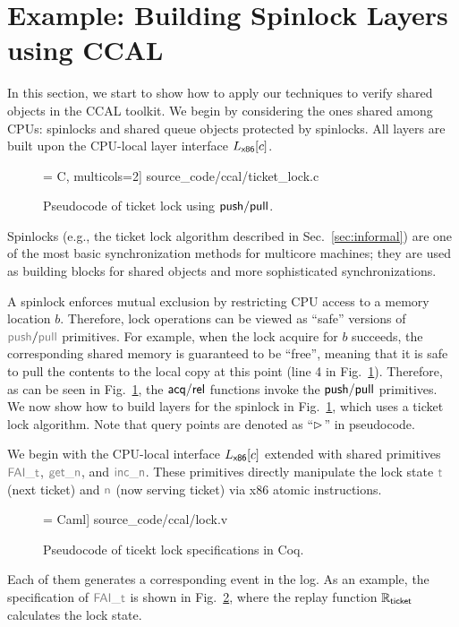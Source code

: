 \section{Example: Building Spinlock Layers using CCAL}
\label{chapter:ccal:sec:example}


In this section, we start to show how to apply our techniques to verify shared objects in the CCAL toolkit.
We begin by considering the ones
shared among CPUs: spinlocks and shared queue objects protected by spinlocks.
All layers are built upon the CPU-local layer interface
$L_\mathsf{x86}[c]$.


\begin{figure}[t]
 = C, multicols=2] {source_code/ccal/ticket_lock.c}
\caption{Pseudocode of ticket lock using $\mathsf{push}/\mathsf{pull}$.}
\label{fig:exp:real_ticket_lock}
\end{figure}

Spinlocks (e.g., the ticket lock algorithm described in Sec.~\ref{sec:informal}) 
are one of the most basic synchronization
methods for multicore machines; they are used as building
blocks for shared objects and more sophisticated synchronizations.

A spinlock enforces mutual exclusion by restricting CPU access to
a memory location $b$. Therefore, lock operations can be viewed
as ``safe'' versions of $\cpush/\cpull$ primitives.
For example, when the lock acquire  for $b$ succeeds,
the corresponding shared memory is guaranteed
to be ``free'', meaning that it is safe to 
pull the contents to the local copy at this point (line 4 in Fig.~\ref{fig:exp:real_ticket_lock}).
Therefore, as can be seen in Fig.~\ref{fig:exp:real_ticket_lock},
the $\mathsf{acq}/\mathsf{rel}$ functions invoke the $\mathsf{push}/\mathsf{pull}$ primitives.
We now show how to build layers for the spinlock
in Fig.~\ref{fig:exp:real_ticket_lock}, which uses a ticket lock algorithm. Note that query points are denoted as ``$\rhd$'' in pseudocode.

We begin with the CPU-local interface $L_\mathsf{x86}[c]$ extended with shared primitives
$\commc{FAI\_t}$, $\commc{get\_n}$, and $\commc{inc\_n}$.
These primitives directly manipulate the lock state $\commc{t}$
(next ticket) and $\commc{n}$ (now serving ticket)
via x86 atomic instructions. 

\begin{figure}[t]
 = Caml] {source_code/ccal/lock.v}
\caption{Pseudocode of ticekt lock specifications in Coq.}
\label{fig:exp:tlock}
\end{figure}
Each of them generates a corresponding event in the 
log. As an example, the specification of $\commc{FAI\_t}$ is shown in Fig.~\ref{fig:exp:tlock},
where the replay function $\mathbb{R}_{\mathsf{\textcolor{black}{ticket}}}$ calculates  the lock state.
 
